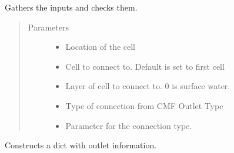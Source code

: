 \documentclass[letterpaper,10pt,english]{sphinxmanual}
\begin{document}
\begin{fulllineitems}
\begin{fulllineitems}
\end{fulllineitems}


\begin{fulllineitems}
\label{\detokenize{cmf:livestock.components.comp_cmf.CMFOutlet.run_checks}}
Gathers the inputs and checks them.
\begin{quote}\begin{description}
\item[{Parameters}] \leavevmode\begin{itemize}
\item {} 
 \textendash{} Location of the cell

\item {} 
 \textendash{} Cell to connect to. Default is set to first cell

\item {} 
 \textendash{} Layer of cell to connect to. 0 is surface water.

\item {} 
 \textendash{} Type of connection from CMF Outlet Type

\item {} 
 \textendash{} Parameter for the connection type.

\end{itemize}

\end{description}\end{quote}

\end{fulllineitems}


\begin{fulllineitems}
\label{\detokenize{cmf:livestock.components.comp_cmf.CMFOutlet.set_outlet}}
Constructs a dict with outlet information.

\end{fulllineitems}



\end{fulllineitems}
\end{document}
